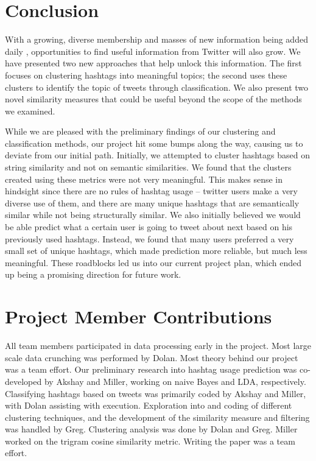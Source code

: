\section{Conclusion}
With a growing, diverse membership and masses of new information being added daily \cite{Holt2011}, opportunities to find useful information from Twitter will also grow. We have presented two new approaches that help unlock this information. The first focuses on clustering hashtags into meaningful topics; the second uses these clusters to identify the topic of tweets through classification. We also present two novel similarity measures that could be useful beyond the scope of the methods we examined. 

While we are pleased with the preliminary findings of our clustering and classification methods, our project hit some bumps along the way, causing us to deviate from our initial path. Initially, we attempted to cluster hashtags based on string similarity and not on semantic similarities. We found that the clusters created using these metrics were not very meaningful. This makes sense in hindsight since there are no rules of hashtag usage -- twitter users make a very diverse use of them, and there are many unique hashtags that are semantically similar while not being structurally similar. We also initially believed we would be able predict what a certain user is going to tweet about next based on his previously used hashtags. Instead, we found that many users preferred a very small set of unique hashtags, which made prediction more reliable, but much less meaningful. These roadblocks led us into our current project plan, which ended up being a promising direction for future work.


\section{Project Member Contributions}
All team members participated in data processing early in the project.  Most large scale data crunching was performed by Dolan. Most theory behind our project was a team effort.  Our preliminary research into hashtag usage prediction was co-developed by Akshay and Miller, working on naive Bayes and LDA, respectively.  Classifying hashtags based on tweets was primarily coded by Akshay and Miller, with Dolan assisting with execution. Exploration into and coding of different clustering techniques, and the development of the similarity measure and filtering was handled by Greg. Clustering analysis was done by Dolan and Greg. Miller worked on the trigram cosine similarity metric. Writing the paper was a team effort.